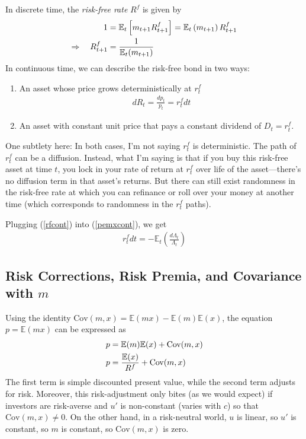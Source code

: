 \documentclass[a4paper,12pt]{scrartcl}
\begin{document}
In discrete time, the \emph{risk-free rate} $R^f$ is given by
\begin{align}
    1 &= \mathbb{E}_t\left[m_{t+1} R^f_{t+1}\right]
    =  \mathbb{E}_t\left(m_{t+1}\right) R^f_{t+1} \notag \\
    \Rightarrow \quad R^f_{t+1}
    &= \frac{1}{\mathbb{E}_t(m_{t+1})}
\end{align}
In continuous time, we can describe the risk-free bond in two ways:
\begin{enumerate}
  \item An asset whose price grows deterministically at $r_t^f$
    \begin{align}
      dR_t = \frac{dp_t}{p_t} = r^f_t dt
      \label{rfcont}
    \end{align}

  \item An asset with constant unit price that pays a constant dividend
    of $D_t=r^f_t$.
\end{enumerate}
One subtlety here: In both cases, I'm not saying $r^f_t$ is
deterministic. The path of $r^f_t$ can be a diffusion. Instead, what I'm
saying is that if you buy this risk-free asset at time $t$, you lock in
your rate of return at $r^f_t$ over life of the asset---there's no
diffusion term in that asset's returns. But there can still exist
randomness in the risk-free rate at which you can refinance or roll over
your money at another time (which corresponds to randomness in the
$r^f_t$ paths).

Plugging (\ref{rfcont}) into (\ref{pemxcont}), we get
\begin{align}
  r^f_t dt = -\mathbb{E}_t\left(\frac{d\Lambda_t}{\Lambda_t}\right)
\end{align}

\subsection{Risk Corrections, Risk Premia, and Covariance with $m$}

Using the identity $\text{Cov}(m,x) = \mathbb{E}(mx) -
\mathbb{E}(m)\mathbb{E}(x)$, the equation $p=\mathbb{E}(mx)$ can be
expressed as
\begin{align}
  p &= \mathbb{E}(m)\mathbb{E}(x) + \text{Cov}(m,x)\notag\\
  p &= \frac{\mathbb{E}(x)}{R^f} + \text{Cov}(m,x)
    \label{eq:riskcorrectPrice}
\end{align}
The first term is simple discounted present value, while the second term
adjusts for risk. Moreover, this risk-adjustment only bites (as we
would expect) if investors are risk-averse and $u'$ is non-constant (varies
with $c$) so that $\text{Cov}(m,x)\neq 0$.  On the other hand, in a
risk-neutral world, $u$ is linear, so $u'$ is constant, so $m$ is
constant, so $\text{Cov}(m,x)$ is zero.
\end{document}
